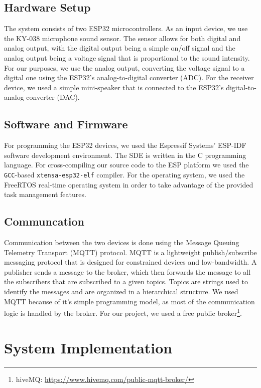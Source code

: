 \documentclass[conference]{IEEEtran}
\begin{document}
\subsection{Hardware Setup}
The system consists of two ESP32\cite{ESP32_Manual} microcontrollers.
As an input device, we use the KY-038\cite{KY-038} microphone sound sensor.
The sensor allows for both digital and analog output, with the digital output being a simple
on/off signal and the analog output being a voltage signal that is proportional to the sound intensity.
For our purposes, we use the analog output, converting the voltage signal to a digital one using the
ESP32's analog-to-digital converter (ADC).
For the receiver device, we used a simple mini-speaker that is connected to the ESP32's digital-to-analog converter (DAC).

\subsection{Software and Firmware}

For programming the ESP32 devices, we used the Espressif Systems' ESP-IDF\cite{ESP-IDF}
software development environment. The SDE is written in the C programming 
language. For cross-compiling our source code to the ESP platform we used the \texttt{GCC}-based
\texttt{xtensa-esp32-elf} compiler. 
For the operating system, we used the FreeRTOS\cite{FreeRTOS} real-time operating system
in order to take advantage of the provided task management features.
\subsection{Communcation}

Communication between the two devices is done using the Message Queuing Telemetry Transport (MQTT) protocol\cite{MQTT_Survey}.
MQTT is a lightweight publish/subscribe messaging protocol that is designed for constrained devices and low-bandwidth.
A publisher sends a message to the broker, which then forwards the message to all the subscribers that are subscribed to a given topics.
Topics are strings used to identify the messages and are organized in a hierarchical structure.
We used MQTT because of it's simple programming model, as most of the communication logic is handled by the broker.
For our project, we used a free public broker\footnote{hiveMQ: \url{https://www.hivemq.com/public-mqtt-broker/}}.

\section{System Implementation}
\label{sec:system_implementation}
\end{document}
